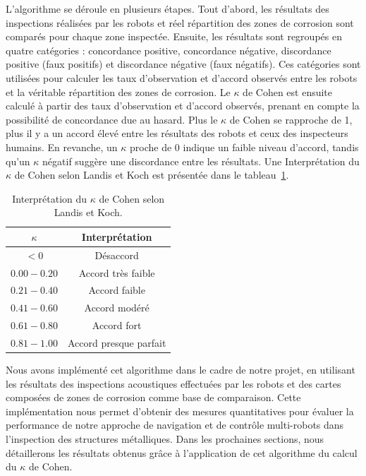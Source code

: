 \documentclass[francais,RandD]{rapportPFE}
\begin{document}
			L'algorithme se déroule en plusieurs étapes.
			Tout d'abord, les résultats des inspections réalisées par les robots et réel répartition des zones de corrosion sont comparés pour chaque zone inspectée.
			Ensuite, les résultats sont regroupés en quatre catégories : concordance positive, concordance négative, discordance positive (faux positifs) et discordance négative (faux négatifs).
			Ces catégories sont utilisées pour calculer les taux d'observation et d'accord observés entre les robots et la véritable répartition des zones de corrosion.
			Le $\kappa$ de Cohen est ensuite calculé à partir des taux d'observation et d'accord observés, prenant en compte la possibilité de concordance due au hasard.
			Plus le $\kappa$ de Cohen se rapproche de 1, plus il y a un accord élevé entre les résultats des robots et ceux des inspecteurs humains.
			En revanche, un $\kappa$ proche de 0 indique un faible niveau d'accord, tandis qu'un $\kappa$ négatif suggère une discordance entre les résultats.
			Une Interprétation du $\kappa$ de Cohen selon Landis et Koch est présentée dans le tableau~\ref{tab:Kappa_Cohen}.

			\begin{table}[h!]
				\centering
				\begin{tabular}{|c|c|}
					\hline
					$\kappa$ & Interprétation \\
					\hline
					$< 0$ & Désaccord \\
					\hline
					$0.00 - 0.20$ & Accord très faible \\
					\hline
					$0.21 - 0.40$ & Accord faible \\
					\hline
					$0.41 - 0.60$ & Accord modéré \\
					\hline
					$0.61 - 0.80$ & Accord fort \\
					\hline
					$0.81 - 1.00$ & Accord presque parfait \\
					\hline
				\end{tabular}
				\caption{Interprétation du $\kappa$ de Cohen selon Landis et Koch.}
				\label{tab:Kappa_Cohen}
			\end{table}

			Nous avons implémenté cet algorithme dans le cadre de notre projet, en utilisant les résultats des inspections acoustiques effectuées par les robots et des cartes composées de zones de corrosion comme base de comparaison.
			Cette implémentation nous permet d'obtenir des mesures quantitatives pour évaluer la performance de notre approche de navigation et de contrôle multi-robots dans l'inspection des structures métalliques.
			Dans les prochaines sections, nous détaillerons les résultats obtenus grâce à l'application de cet algorithme du calcul du $\kappa$ de Cohen.
\end{document}
